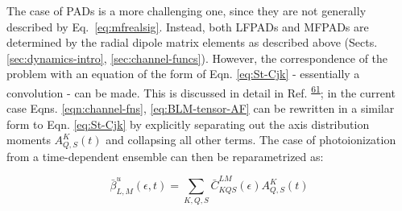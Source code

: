 \documentclass[10pt]{article}
\begin{document}

The case of PADs is a more challenging one, since they are not generally described by Eq.~\ref{eq:mfrealsig}. Instead, both LFPADs and MFPADs are determined by the radial dipole matrix elements as described above (Sects. \ref{sec:dynamics-intro}, \ref{sec:channel-funcs}). However, the correspondence of the problem with an equation of the form of Eqn. \ref{eq:St-Cjk} - essentially a convolution - can be made. This is discussed in detail in Ref. \textsuperscript{\hyperref[csl:61]{61}}; in the current case Eqns. \ref{eqn:channel-fns}, \ref{eq:BLM-tensor-AF} can be rewritten in a similar form to Eqn. \ref{eq:St-Cjk} by explicitly separating out the axis distribution moments $A_{Q,S}^{K}(t)$ and collapsing all other terms. The case of photoionization from a time-dependent ensemble can then be reparametrized as:




\begin{equation}
\bar{\beta}_{L,M}^{u}(\epsilon,t)=\sum_{K,Q,S}\bar{C}_{KQS}^{LM}(\epsilon)A_{Q,S}^{K}(t)
\label{eqn:beta-convolution-C}
\end{equation}
\end{document}
